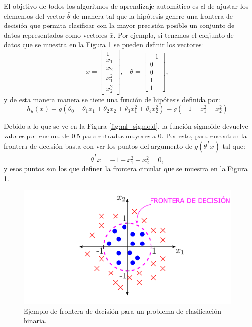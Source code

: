 El objetivo de todos los algoritmos de aprendizaje automático es el de ajustar los elementos del vector $\bar{\theta}$ de manera tal que la hipótesis genere una frontera de decisión que permita clasificar con la mayor precisión posible un conjunto de datos representados como vectores $\bar{x}$. Por ejemplo, si tenemos el conjunto de datos que se muestra en la Figura \ref{fig:ml_dataexample} se pueden definir los vectores:
\begin{equation*}
  \bar{x}=\begin{bmatrix}
    1     \\
    x_1   \\
    x_2   \\
    x_1^2 \\
    x_2^2
  \end{bmatrix},\quad
  \bar{\theta}=\begin{bmatrix}
    -1 \\
    0  \\
    0  \\
    1  \\
    1
  \end{bmatrix},
\end{equation*}
y de esta manera manera se tiene una función de hipótesis definida por:
\begin{equation*}
  h_{\bar{\theta}}(\bar{x})=g(\theta_0+\theta_1 x_1 + \theta_2 x_2 + \theta_3 x_1^2 + \theta_4 x_2^2) = g(-1+x_1^2+x_2^2)
\end{equation*}

Debido a lo que se ve en la Figura \ref{fig:ml_sigmoid}, la función sigmoide devuelve valores por encima de 0,5 para entradas mayores a 0. Por esto, para encontrar la frontera de decisión basta con ver los puntos del argumento de $g(\bar{\theta}^T \bar{x})$ tal que:
\begin{equation*}
  \bar{\theta}^T \bar{x} = -1+x_1^2+x_2^2 = 0,
\end{equation*}
y esos puntos son los que definen la frontera circular que se muestra en la Figura \ref{fig:ml_dataexample}.
\begin{figure}[ht!]
  \centering
  \includegraphics[width=0.8\linewidth]{images/05-Machine Learning/ml_dataexample.png}
  \caption{Ejemplo de frontera de decisión para un problema de clasificación binaria.}
  \label{fig:ml_dataexample}
\end{figure}

